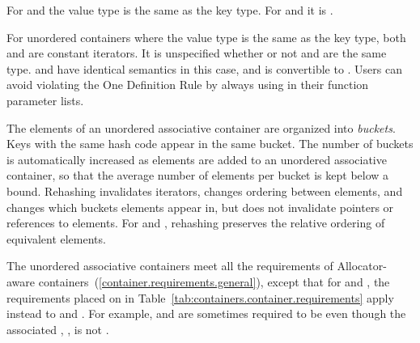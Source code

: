 \pnum
For  and  the value type is
the same as the key type.  For  and
 it is .

\pnum
For unordered containers where the value type is the same as the key
type, both  and  are constant
iterators. It is unspecified whether or not  and
 are the same type.
\enternote {} and  have identical
semantics in this case, and  is convertible to
. Users can avoid violating the One Definition Rule
by always using  in their function parameter lists.
\exitnote

\pnum
{}%
%
The elements of an unordered associative container are organized into
\textit{buckets}.  Keys with the same hash code appear in the same
bucket.  The number of buckets is automatically increased as elements
are added to an unordered associative container, so that the average
number of elements per bucket is kept below a bound.  Rehashing
invalidates iterators, changes ordering between elements, and changes
which buckets elements appear in, but does not invalidate pointers or
references to elements. For  and
, rehashing preserves the relative ordering of
equivalent elements.

\pnum
The unordered associative containers meet all the requirements of Allocator-aware
containers~(\ref{container.requirements.general}), except that for
 and , the requirements placed on 
in Table~\ref{tab:containers.container.requirements} apply instead to 
and . \enternote For example,  and 
are sometimes required to be  even though the associated
, , is not
. \exitnote

